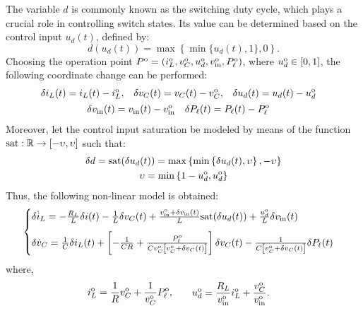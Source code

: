 The variable $d$ is commonly known as the switching duty cycle, which plays a crucial role in controlling switch states. Its value can be determined based on the control input $u_d(t)$, defined by:
\begin{equation}
  d(u_d(t)) = \max\left\{\min\{u_d(t), 1\}, 0\right\}.
\end{equation}
Choosing the operation point $P^{\rm o} = (i_L^{\rm o}, v_C^{\rm o}, u_d^{\rm o}, v_{\rm in}^{\rm o}, P_{\ell}^{\rm o})$, where $u_d^{\rm o} \in \left[0,1\right]$, the following coordinate change can be performed:
\begin{gather}
  \begin{align}
    \delta i_L(t) & = i_L(t) - i_L^{\rm o}, &
    \delta v_C(t) & = v_C(t) - v_C^{\rm o}, &
    \delta u_d(t) & = u_d(t) - u_d^{\rm o}
  \end{align} \\
  \begin{align}
    \delta v_{\rm in}(t) & = v_{\rm in}(t) - v_{\rm in}^{\rm o} &
    \delta P_{\ell}(t)   & = P_{\ell}(t) - P_{\ell}^{\rm o}
  \end{align}
\end{gather}
Moreover, let the control input saturation be modeled by means of the function $\rm{sat} : \mathbb{R} \rightarrow \left[-\upsilon , \upsilon  \right]$ such that:
\begin{gather}
  \delta d = {\rm sat} (\delta u_d(t)) = \max\left\{\min\left\{\delta u_d(t), \upsilon\right\}, -\upsilon\right\} \\
  \upsilon = \min\left\{1 - u_d^{\rm o}, u_d^{\rm o}\right\}
\end{gather}
Thus, the following non-linear model is obtained:
\begin{equation}
  \begin{cases}
    \delta \dot i_L = - \frac{R_L} L \delta i(t) - \frac{1}{L} \delta v_C(t) + \frac{v_{\rm{in}}^{\rm o} +\delta v_{\rm{in}}(t)}{L} {\rm sat}(\delta u_d(t)) + \frac{u_d^{\rm o}}{L} \delta v_{\rm in} (t) \\[8pt]
    \delta \dot v_C = \frac{1}{C} \delta i_L(t) + \left[- \frac{1}{C R}
      + \frac{P_{\ell}^o}{C v_C^o \left[v_C^o + \delta v_C(t)\right]} \right] \delta v_C(t)
    - \frac{1}{C \left[v_C^{\rm o} + \delta v_C(t)\right] } \delta P_{\ell}(t)
  \end{cases}
  \label{eq:buck_conveter_nonlinear_model_sat}
\end{equation}
where, 
\begin{align}
  & \begin{aligned}
      i_L^{\mathrm{o}} & = \frac{1}{R} v_C^{\mathrm{o}} + \frac{1}{v_C^{\mathrm{o}}} P_{\ell}^{\mathrm{o}},
    \end{aligned}
  & \begin{aligned}
      u_d^{\mathrm{o}} & = \frac{R_L}{v_{\mathrm{in}}^{\rm o}} i_L^{\mathrm{o}} + \frac{v_C^{\mathrm{o}}}{v_{\mathrm{in}}^{\rm o}}.
    \end{aligned}
    \notag
\end{align}
